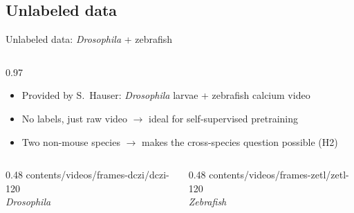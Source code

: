 \subsection{Unlabeled data}

\begin{frame}[t]{Unlabeled data: \textit{Drosophila} + zebrafish}
\begin{columns}
\begin{column}{0.97\textwidth}
{\footnotesize\color{black}
\begin{itemize}\itemsep=0.2em
\item Provided by S.~Hauser: \textit{Drosophila} larvae + zebrafish calcium video
\item No labels, just raw video $\to$ ideal for self-supervised pretraining
\item Two non-mouse species $\to$ makes the cross-species question possible (H2)
\end{itemize}}
\end{column}
\end{columns}

\vfill
\begin{columns}[t]
\begin{column}{0.48\textwidth}\centering
{}%
{contents/videos/frames-dczi/dczi-}{1}{20}\\[0.3em]
{\scriptsize\itshape Drosophila}
\end{column}
\begin{column}{0.48\textwidth}\centering
{}%
{contents/videos/frames-zetl/zetl-}{1}{20}\\[0.3em]
{\scriptsize\itshape Zebrafish}
\end{column}
\end{columns}

\vfill
{}
\end{frame}

